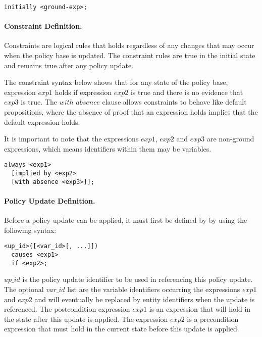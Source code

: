 \documentclass[10pt, twocolumn]{article}
\begin{document}
          \begin{verbatim}initially <ground-exp>;\end{verbatim}

        \paragraph{Constraint Definition.}

          Constraints are logical rules that holds regardless of any changes
          that may occur when the policy base is updated. The constraint rules
          are true in the initial state and remains true after any policy
          update.

          The constraint syntax below shows that for any state of the policy
          base, expression $exp1$ holds if expression $exp2$ is true and there
          is no evidence that $exp3$ is true. The $with$ $absence$ clause
          allows constraints to behave like default propositions, where the
          absence of proof that an expression holds implies that the default
          expression holds.

          It is important to note that the expressions $exp1$, $exp2$ and
          $exp3$ are non-ground expressions, which means identifiers within
          them may be variables.

          \begin{verbatim}
always <exp1>
  [implied by <exp2>
  [with absence <exp3>]];
          \end{verbatim}

        \paragraph{Policy Update Definition.}

          Before a policy update can be applied, it must first be defined by
          by using the following syntax:

          \begin{verbatim}
<up_id>([<var_id>[, ...]])
  causes <exp1>
  if <exp2>;
          \end{verbatim}

          $up\_id$ is the policy update identifier to be used in referencing
          this policy update. The optional $var\_id$ list are the variable
          identifiers occurring the expressions $exp1$ and $exp2$ and will
          eventually be replaced by entity identifiers when the update is
          referenced. The postcondition expression $exp1$ is an expression that
          will hold in the state after this update is applied. The expression
          $exp2$ is a precondition expression that must hold in the current
          state before this update is applied.
\end{document}
